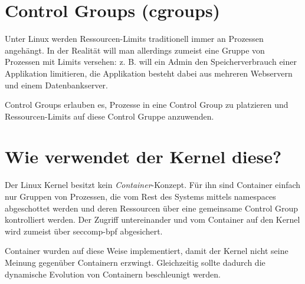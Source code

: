\section{Control Groups (cgroups)}

Unter Linux werden Ressourcen-Limits traditionell immer an Prozessen angehängt. In der Realität will man allerdings zumeist eine Gruppe von Prozessen mit Limits versehen: z. B. will ein Admin den Speicherverbrauch einer Applikation limitieren, die Applikation besteht dabei aus mehreren Webservern und einem Datenbankserver.

Control Groups erlauben es, Prozesse in eine Control Group zu platzieren und Ressourcen-Limits auf diese Control Gruppe anzuwenden.

\section{Wie verwendet der Kernel diese?}

Der Linux Kernel besitzt kein \textit{Container}-Konzept. Für ihn sind Container einfach nur Gruppen von Prozessen, die vom Rest des Systems mittels namespaces abgeschottet werden und deren Ressourcen über eine gemeinsame Control Group kontrolliert werden. Der Zugriff untereinander und vom Container auf den Kernel wird zumeist über seccomp-bpf abgesichert.

Container wurden auf diese Weise implementiert, damit der Kernel nicht seine Meinung gegenüber Containern erzwingt. Gleichzeitig sollte dadurch die dynamische Evolution von Containern beschleunigt werden.
